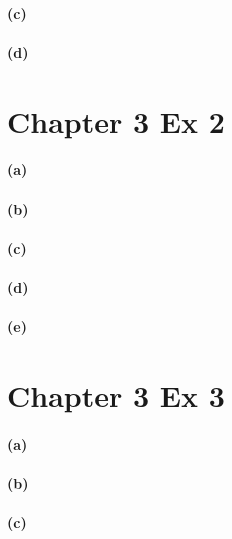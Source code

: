\documentclass[11pt, letterpaper]{article}
\begin{document}
\paragraph{(c)}
\paragraph{(d)}

\section{Chapter 3 Ex 2}
\paragraph{(a)}
\paragraph{(b)}
\paragraph{(c)}
\paragraph{(d)}
\paragraph{(e)}

\section{Chapter 3 Ex 3}
\paragraph{(a)}
\paragraph{(b)}
\paragraph{(c)}
\end{document}
